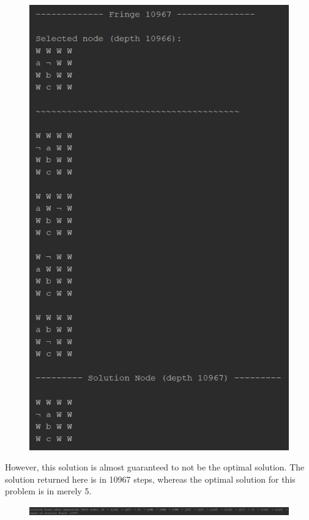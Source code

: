 \documentclass{article}
\begin{document}
	\begin{figure}[h]	
		\centering
		\includegraphics[height=0.7\textheight,keepaspectratio]{DFS-2-3.png}
	\end{figure}

	However, this solution is almost guaranteed to not be the optimal solution. The solution returned here is in 10967 steps, whereas the optimal solution for this problem is in merely 5.
	
	\begin{figure}[h]	
		\centering
		\includegraphics[width=\textwidth,keepaspectratio]{DFS-2-4.png}
	\end{figure}
\end{document}
